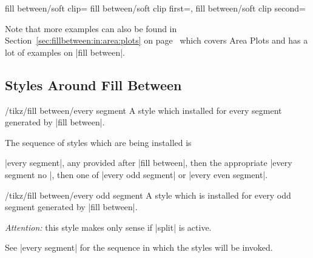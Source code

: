\begin{tikzkeylist}{%
	fill between/soft clip=
	fill between/soft clip first=,
	fill between/soft clip second=%
}
\begin{codeexample}[]
\end{codeexample}


	Note that more examples can also be found in Section~\ref{sec:fillbetween:in:area:plots} on page~\pageref{sec:fillbetween:in:area:plots} which covers Area Plots and has a lot of examples on |fill between|.
\end{tikzkeylist}

\subsection{Styles Around Fill Between}

\begin{stylekey}{/tikz/fill between/every segment}
	A style which installed for every segment generated by |fill between|.

	The sequence of styles which are being installed is 

	|every segment|, any  provided after | fill between|, then the appropriate |every segment no |, then one of |every odd segment| or |every even segment|.
\end{stylekey}

\begin{stylekey}{/tikz/fill between/every odd segment}
	A style which is installed for every odd segment generated by |fill between|.

	\emph{Attention:} this style makes only sense if |split| is active.

	See |every segment| for the sequence in which the styles will be invoked.
\end{stylekey}


